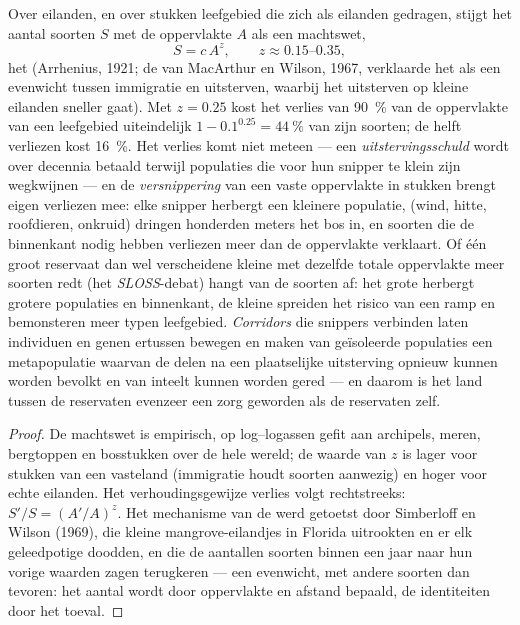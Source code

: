\begin{proposition}\label{prop:b3:conservation-biology:area}
Over eilanden, en over stukken leefgebied die zich als eilanden
gedragen, stijgt het aantal soorten $S$ met de oppervlakte $A$ als een
machtswet,
\[
S = c\,A^{z}, \qquad z \approx 0.15\text{--}0.35,
\]
het \emph{} (Arrhenius, 1921; de
 van MacArthur en Wilson, 1967, verklaarde het als
een evenwicht tussen immigratie en uitsterven, waarbij het uitsterven
op kleine eilanden sneller gaat). Met $z = 0.25$ kost het verlies van
\qty{90}{\%} van de oppervlakte van een leefgebied uiteindelijk
$1 - 0.1^{0.25} = \qty{44}{\%}$ van zijn soorten; de helft verliezen
kost \qty{16}{\%}. Het verlies komt niet meteen --- een
\emph{uitstervingsschuld} wordt over decennia betaald terwijl
populaties die voor hun snipper te klein zijn wegkwijnen --- en de
\emph{versnippering} van een vaste oppervlakte in stukken brengt eigen
verliezen mee: elke snipper herbergt een kleinere populatie,
\emph{} (wind, hitte, roofdieren, onkruid) dringen
honderden meters het bos in, en soorten die de binnenkant nodig hebben
verliezen meer dan de oppervlakte verklaart. Of één groot reservaat dan
wel verscheidene kleine met dezelfde totale oppervlakte meer soorten
redt (het \emph{SLOSS}-debat) hangt van de soorten af: het grote
herbergt grotere populaties en binnenkant, de kleine spreiden het
risico van een ramp en bemonsteren meer typen leefgebied.
\emph{Corridors} die snippers verbinden laten individuen en genen
ertussen bewegen en maken van geïsoleerde populaties een metapopulatie
waarvan de delen na een plaatselijke uitsterving opnieuw kunnen worden
bevolkt en van inteelt kunnen worden gered --- en daarom is het land
tussen de reservaten evenzeer een zorg geworden als de reservaten zelf.
\end{proposition}
\begin{proof}
De machtswet is empirisch, op log--logassen gefit aan archipels, meren,
bergtoppen en bosstukken over de hele wereld; de waarde van $z$ is
lager voor stukken van een vasteland (immigratie houdt soorten
aanwezig) en hoger voor echte eilanden. Het verhoudingsgewijze verlies
volgt rechtstreeks: $S'/S = (A'/A)^{z}$. Het mechanisme van de
 werd getoetst door Simberloff en Wilson (1969), die
kleine mangrove-eilandjes in Florida uitrookten en er elk geleedpotige
doodden, en die de aantallen soorten binnen een jaar naar hun vorige
waarden zagen terugkeren --- een evenwicht, met andere soorten dan
tevoren: het aantal wordt door oppervlakte en afstand bepaald, de
identiteiten door het toeval.
\end{proof}

